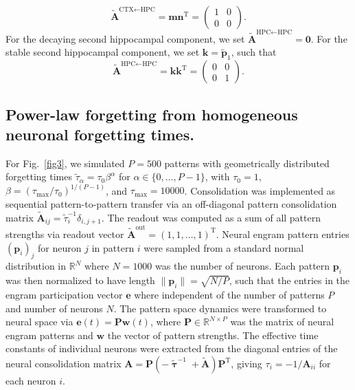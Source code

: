 \begin{equation}
    \mathbf{\tilde{A}}^{\text{CTX} \leftarrow \text{HPC}} = \mathbf{m} \mathbf{n}^{\text{T}} = \begin{pmatrix}
    1 & 0 \\
    0 & 0
    \end{pmatrix}.
\end{equation}
For the decaying second hippocampal component, we set $\mathbf{\tilde{A}}^{\text{HPC} \leftarrow \text{HPC}} = \mathbf{0}$. For the stable second hippocampal component, we set $\mathbf{k} = \mathbf{\tilde{p}}_1$, such that
\begin{equation}
    \mathbf{\tilde{A}}^{\text{HPC} \leftarrow \text{HPC}} = \mathbf{k} \mathbf{k}^{\text{T}} = \begin{pmatrix}
        0 & 0 \\
        0 & 1
    \end{pmatrix}.
\end{equation}

\subsection{Power-law forgetting from homogeneous neuronal forgetting times.}
For Fig.~\ref{fig3}, we simulated $P=500$ patterns with geometrically distributed forgetting times $\tilde{\tau}_\alpha = \tau_0 \beta^\alpha$ for $\alpha \in \{0,\ldots,P-1\}$, with $\tau_0 = 1$, $\beta = (\tau_{\max}/\tau_0)^{1/(P-1)}$, and $\tau_{\max} = 10000$. Consolidation was implemented as sequential pattern-to-pattern transfer via an off-diagonal pattern consolidation matrix $\mathbf{\tilde{A}}_{ij} = \tilde{\tau}_i^{-1} \delta_{i,j+1}$. The readout was computed as a sum of all pattern strengths via readout vector $\mathbf{\tilde{A}}^{\text{out}} = (1, 1, \ldots, 1)^{\text{T}}$. Neural engram pattern entries $(\mathbf{p}_i)_j$ for neuron $j$ in pattern $i$ were sampled from a standard normal distribution in $\mathbb{R}^N$ where $N=1000$ was the number of neurons. Each pattern $\mathbf{p}_i$ was then normalized to have length $\|\mathbf{p}_i\| = \sqrt{N/P}$, such that the entries in the engram participation vector $\mathbf{e}$ where independent of the number of patterns $P$ and number of neurons $N$. The pattern space dynamics were transformed to neural space via $\mathbf{e}(t) = \mathbf{P}\mathbf{w}(t)$, where $\mathbf{P} \in \mathbb{R}^{N \times P}$ was the matrix of neural engram patterns and $\mathbf{w}$ the vector of pattern strengths. The effective time constants of individual neurons were extracted from the diagonal entries of the neural consolidation matrix $\mathbf{A} = \mathbf{P}(-\boldsymbol{\tilde{\uptau}}^{-1} + \mathbf{\tilde{A}})\mathbf{P}^{\text{T}}$, giving $\tau_i = -1/\mathbf{A}_{ii}$ for each neuron $i$.

